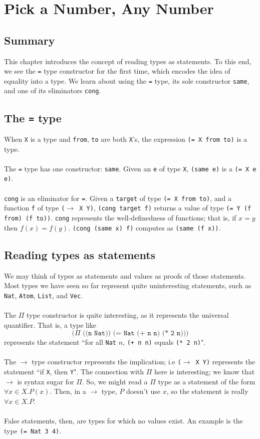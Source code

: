 \documentclass{article}
\newcommand{\ttt}[1]{\texttt{#1}}
\begin{document}
\section{Pick a Number, Any Number}
\subsection{Summary}
This chapter introduces the concept of reading types as statements. To this end, we see the \ttt{=} type constructor for the first time, which encodes the idea of equality into a type. We learn about using the \ttt{=} type, its sole constructor \ttt{same}, and one of its eliminators \ttt{cong}.
\subsection{The \ttt{=} type}
When \ttt{X} is a type and \ttt{from}, \ttt{to} are both \ttt{X}'s, the expression \ttt{(= X from to)} is a type.
\\ \\
The \ttt{=} type has one constructor: \ttt{same}. Given an \ttt{e} of type \ttt{X}, \ttt{(same e)} is a \ttt{(= X e e)}.
\\ \\
\ttt{cong} is an eliminator for \ttt{=}. Given a \ttt{target} of type \ttt{(= X from to)}, and a function \ttt{f} of type \ttt{(\(\to\) X Y)}, \ttt{(cong target f)} returns a value of type \ttt{(= Y (f from) (f to))}. \ttt{cong} represents the well-definedness of functions; that is, if \(x = y\) then \(f(x) = f(y)\). \ttt{(cong (same x) f)} computes as \ttt{(same (f x))}.
\subsection{Reading types as statements}
We may think of types as statements and values as proofs of those statements. Most types we have seen so far represent quite uninteresting statements, such as \ttt{Nat}, \ttt{Atom}, \ttt{List}, and \ttt{Vec}.
\\ \\
The \(\Pi\) type constructor is quite interesting, as it represents the universal quantifier. That is, a type like \[\ttt{(\(\Pi\) ((n Nat)) (= Nat (+ n n) (* 2 n)))}\] represents the statement ``for all \ttt{Nat} \(n\), \ttt{(+ n n)} equals \ttt{(* 2 n)}".
\\ \\
The \(\to\) type constructor represents the implication; i.e \ttt{(\(\to\) X Y)} represents the statement ``if \ttt{X}, then \ttt{Y}". The connection with \(\Pi\) here is interesting; we know that \(\to\) is syntax sugar for \(\Pi\). So, we might read a \(\Pi\) type as a statement of the form \(\forall x \in X. P(x)\). Then, in a \(\to\) type, \(P\) doesn't use \(x\), so the statement is really \(\forall x \in X. P\). 
\\ \\
False statements, then, are types for which no values exist. An example is the type \ttt{(= Nat 3 4)}.
\end{document}
